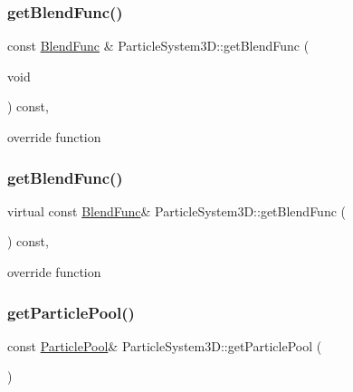 \subsubsection{\texorpdfstring{get\+Blend\+Func()}{getBlendFunc()}\hspace{0.1cm}{\footnotesize\ttfamily [1/2]}}
{\footnotesize\ttfamily const \hyperlink{structBlendFunc}{Blend\+Func} \& Particle\+System3\+D\+::get\+Blend\+Func (\begin{DoxyParamCaption}\item[{void}]{ }\end{DoxyParamCaption}) const\hspace{0.3cm}{\ttfamily [override]}, {\ttfamily [virtual]}}

override function \mbox{\label{classParticleSystem3D_a23387a435e3bc2f567194a5e260a9e93}} 
\subsubsection{\texorpdfstring{get\+Blend\+Func()}{getBlendFunc()}\hspace{0.1cm}{\footnotesize\ttfamily [2/2]}}
{\footnotesize\ttfamily virtual const \hyperlink{structBlendFunc}{Blend\+Func}\& Particle\+System3\+D\+::get\+Blend\+Func (\begin{DoxyParamCaption}{ }\end{DoxyParamCaption}) const\hspace{0.3cm}{\ttfamily [override]}, {\ttfamily [virtual]}}

override function \mbox{\label{classParticleSystem3D_a195df72ace8428bc873d0838ebc02a2a}} 
\subsubsection{\texorpdfstring{get\+Particle\+Pool()}{getParticlePool()}\hspace{0.1cm}{\footnotesize\ttfamily [1/2]}}
{\footnotesize\ttfamily const \hyperlink{classDataPool}{Particle\+Pool}\& Particle\+System3\+D\+::get\+Particle\+Pool (\begin{DoxyParamCaption}{ }\end{DoxyParamCaption})\hspace{0.3cm}{\ttfamily [inline]}}

